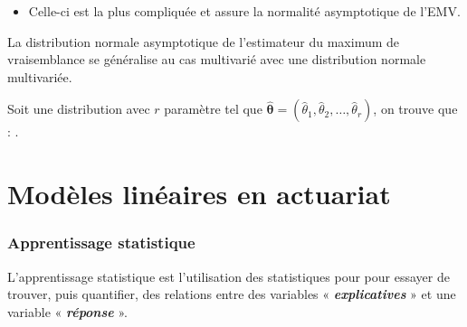 \documentclass[french]{article}
\begin{document}
\begin{multicols*}{2}
\begin{definitionNOHFILLprop}
\begin{description}
		\begin{itemize}
		\item	Celle-ci est la plus compliquée et assure la normalité asymptotique de l'EMV.
		\end{itemize}
\end{description}
\end{definitionNOHFILLprop}


\begin{rappel_enhanced}[Contexte]
La distribution normale asymptotique de l'estimateur du maximum de vraisemblance se généralise au cas multivarié avec une distribution normale multivariée.
\end{rappel_enhanced}

Soit une distribution avec $r$ paramètre tel que $\hat{\bm{\theta}} = (\hat{\theta}_{1}, \hat{\theta}_{2}, \dots, \hat{\theta}_{r})$, on trouve que : .





\pagebreak
\part{Modèles linéaires en actuariat}\label{chapt:modLin}
\section{Apprentissage statistique}\label{sec:StatLearning}
\begin{definitionNOHFILL}
L'apprentissage statistique est l'utilisation des statistiques pour pour essayer de trouver, puis quantifier, des relations entre des variables « \textit{\textbf{explicatives}} » et une variable « \textbf{\textit{réponse}} ». 
\end{definitionNOHFILL}



\columnbreak

\end{multicols*}
\end{document}
